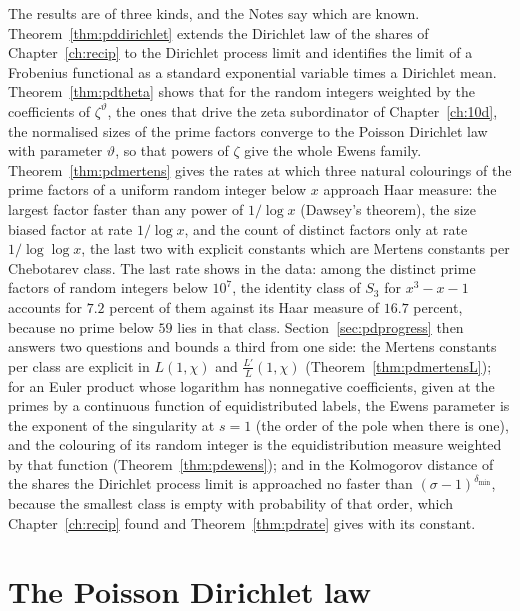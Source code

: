 The results are of three kinds, and the Notes say which are known. Theorem~\ref{thm:pddirichlet} extends the Dirichlet law of the shares of Chapter~\ref{ch:recip} to the Dirichlet process limit and identifies the limit of a Frobenius functional as a standard exponential variable times a Dirichlet mean. Theorem~\ref{thm:pdtheta} shows that for the random integers weighted by the coefficients of $\zeta^\vartheta$, the ones that drive the zeta subordinator of Chapter~\ref{ch:10d}, the normalised sizes of the prime factors converge to the Poisson Dirichlet law with parameter $\vartheta$, so that powers of $\zeta$ give the whole Ewens family. Theorem~\ref{thm:pdmertens} gives the rates at which three natural colourings of the prime factors of a uniform random integer below $x$ approach Haar measure: the largest factor faster than any power of $1/\log x$ (Dawsey's theorem), the size biased factor at rate $1/\log x$, and the count of distinct factors only at rate $1/\log\log x$, the last two with explicit constants which are Mertens constants per Chebotarev class. The last rate shows in the data: among the distinct prime factors of random integers below $10^7$, the identity class of $S_3$ for $x^3-x-1$ accounts for $7.2$ percent of them against its Haar measure of $16.7$ percent, because no prime below $59$ lies in that class. Section~\ref{sec:pdprogress} then answers two questions and bounds a third from one side: the Mertens constants per class are explicit in $L(1,\chi)$ and $\frac{L'}L(1,\chi)$ (Theorem~\ref{thm:pdmertensL}); for an Euler product whose logarithm has nonnegative coefficients, given at the primes by a continuous function of equidistributed labels, the Ewens parameter is the exponent of the singularity at $s=1$ (the order of the pole when there is one), and the colouring of its random integer is the equidistribution measure weighted by that function (Theorem~\ref{thm:pdewens}); and in the Kolmogorov distance of the shares the Dirichlet process limit is approached no faster than $(\sigma-1)^{\delta_{\min}}$, because the smallest class is empty with probability of that order, which Chapter~\ref{ch:recip} found and Theorem~\ref{thm:pdrate} gives with its constant.

\section{The Poisson Dirichlet law}\label{sec:pdlaw}

